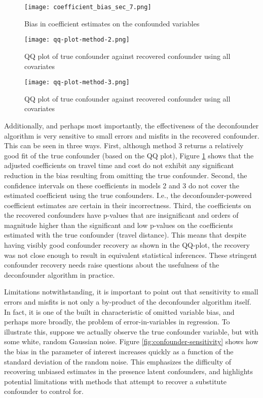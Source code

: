 \begin{figure}
   \centering
   \texttt{[image: coefficient\_bias\_sec\_7.png]}
   \caption{Bias in coefficient estimates on the confounded variables}
   \label{fig:bias-plot}
\end{figure}


\begin{figure}
   \centering
   \texttt{[image: qq-plot-method-2.png]}
   \caption{QQ plot of true confounder against recovered confounder using all covariates}
   \label{fig:qq-plot-method-2}
\end{figure}

\begin{figure}
   \centering
   \texttt{[image: qq-plot-method-3.png]}
   \caption{QQ plot of true confounder against recovered confounder using all covariates}
   \label{fig:qq-plot-method-3}
\end{figure}


Additionally, and perhaps most importantly, the effectiveness of the
deconfounder algorithm is very sensitive to small errors and misfits in the
recovered confounder.
This can be seen in three ways.
First, although method 3 returns a relatively good fit of the
true confounder (based on the QQ plot), Figure \ref{fig:bias-plot} shows that the adjusted coefficients on travel
time and cost do not exhibit any significant reduction in the bias resulting from
omitting the true confounder.
Second, the confidence intervals on these coefficients in models 2 and 3 do not cover the estimated coefficient using the true confounders.
I.e., the deconfounder-powered coefficient estimates are certain in their incorrectness.
Third, the coefficients on the recovered confounders have p-values that are insignificant and orders of magnitude higher than the significant and low p-values on the coefficients estimated with the true confounder (travel distance).
This means that despite having visibly good confounder recovery as shown in the QQ-plot, the recovery was not close enough to result in equivalent statistical inferences.
These stringent confounder recovery needs raise questions about the usefulness of the deconfounder algorithm in practice.

Limitations notwithstanding, it is
important to point out that sensitivity to small errors and misfits is not only a by-product of the deconfounder
algorithm itself. In fact, it is one of the built in characteristic of omitted
variable bias, and perhaps more broadly, the problem of error-in-variables in
regression. To illustrate this, suppose we actually observe the true
confounder variable, but with some white, random Gaussian noise. Figure \ref{fig:confounder-sensitivity}
shows how the bias in the parameter of interest increases quickly as a
function of the standard deviation of the random noise. This emphasizes the
difficulty of recovering unbiased estimates in the presence latent confounders,
and highlights potential limitations with methods that attempt to recover a
substitute confounder to control for.

